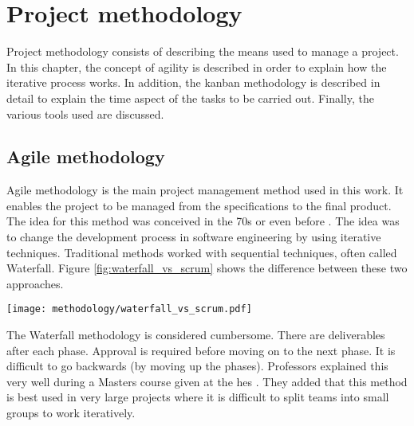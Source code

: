 

\chapter{Project methodology}
\label{chap:methodology}

Project methodology consists of describing the means used to manage a project. In this chapter, the concept of agility is described in order to explain how the iterative process works. In addition, the \gls{kanban} methodology is described in detail to explain the time aspect of the tasks to be carried out. Finally, the various tools used are discussed.

\minitoc
\newpage

\section{Agile methodology}

Agile methodology is the main project management method used in this work. It enables the project to be managed from the specifications to the final product. The idea for this method was conceived in the 70s or even before \cite{abbas_historical_2008}.  The idea was to change the development process in software engineering by using iterative techniques. Traditional methods worked with sequential techniques, often called Waterfall. Figure \ref{fig:waterfall_vs_scrum} shows the difference between these two approaches.
\begin{center}
    \begingroup
    \texttt{[image: methodology/waterfall\_vs\_scrum.pdf]}
    \label{fig:waterfall_vs_scrum}
    \endgroup
\end{center}
The Waterfall methodology is considered cumbersome. There are deliverables after each phase. Approval is required before moving on to the next phase. It is difficult to go backwards (by moving up the phases). Professors explained this very well during a Masters course given at the \gls{hes} \cite{course_MA_ITProMan}. They added that this method is best used in very large projects where it is difficult to split teams into small groups to work iteratively.

